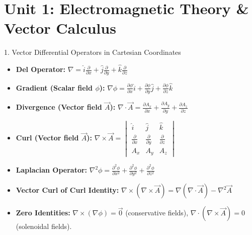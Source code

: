 \chapter{Unit 1: Electromagnetic Theory \& Vector Calculus}

\begin{formulabox}{1. Vector Differential Operators in Cartesian Coordinates}
\begin{itemize}[leftmargin=*,itemsep=2pt]
    \item \textbf{Del Operator:} $\nabla = \hat{i}\frac{\partial}{\partial x} + \hat{j}\frac{\partial}{\partial y} + \hat{k}\frac{\partial}{\partial z}$
    \item \textbf{Gradient (Scalar field $\phi$):} $\nabla\phi = \frac{\partial\phi}{\partial x}\hat{i} + \frac{\partial\phi}{\partial y}\hat{j} + \frac{\partial\phi}{\partial z}\hat{k}$
    \item \textbf{Divergence (Vector field $\vec{A}$):} $\nabla \cdot \vec{A} = \frac{\partial A_x}{\partial x} + \frac{\partial A_y}{\partial y} + \frac{\partial A_z}{\partial z}$
    \item \textbf{Curl (Vector field $\vec{A}$):} $\nabla \times \vec{A} = \begin{vmatrix} \hat{i} & \hat{j} & \hat{k} \\ \frac{\partial}{\partial x} & \frac{\partial}{\partial y} & \frac{\partial}{\partial z} \\ A_x & A_y & A_z \end{vmatrix}$
    \item \textbf{Laplacian Operator:} $\nabla^2 \phi = \frac{\partial^2\phi}{\partial x^2} + \frac{\partial^2\phi}{\partial y^2} + \frac{\partial^2\phi}{\partial z^2}$
    \item \textbf{Vector Curl of Curl Identity:} $\nabla \times (\nabla \times \vec{A}) = \nabla(\nabla \cdot \vec{A}) - \nabla^2 \vec{A}$
    \item \textbf{Zero Identities:} $\nabla \times (\nabla \phi) = \vec{0}$ (conservative fields), $\nabla \cdot (\nabla \times \vec{A}) = 0$ (solenoidal fields).
\end{itemize}
\end{formulabox}

